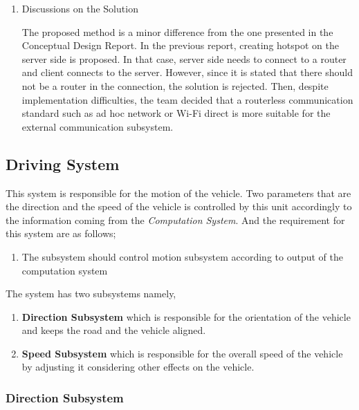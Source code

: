 \documentclass[a4paper,12pt]{article}
\begin{document}
\begin{enumerate}
\item {Discussions on the Solution}


The proposed method is a minor difference from the one presented in the Conceptual Design Report. In the previous report, creating hotspot on the server side is proposed. In that case, server side needs to connect to a router and client connects to the server. However, since it is stated that there should not be a router in the connection, the solution is rejected. Then, despite implementation difficulties, the team decided that a routerless communication standard such as ad hoc network or Wi-Fi direct is more suitable for the external communication subsystem. 

\end{enumerate}




\subsection{Driving System}


This system is responsible for the motion of the vehicle. Two parameters that are the direction and the speed of the vehicle is controlled by this unit accordingly to the information coming from the \textit{Computation System}. And the requirement for this system are as follows;


\begin{enumerate}

\item The subsystem should control motion subsystem according to output of the computation system			

\end{enumerate}



The system has two subsystems namely,


\begin{enumerate}

\item \textbf{Direction Subsystem} which is responsible for the orientation of the vehicle and keeps the road and the vehicle aligned.

\item \textbf{Speed Subsystem} which is responsible for the overall speed of the vehicle by adjusting it considering other effects on the vehicle.

\end{enumerate}


\subsubsection{Direction Subsystem}
\end{document}
